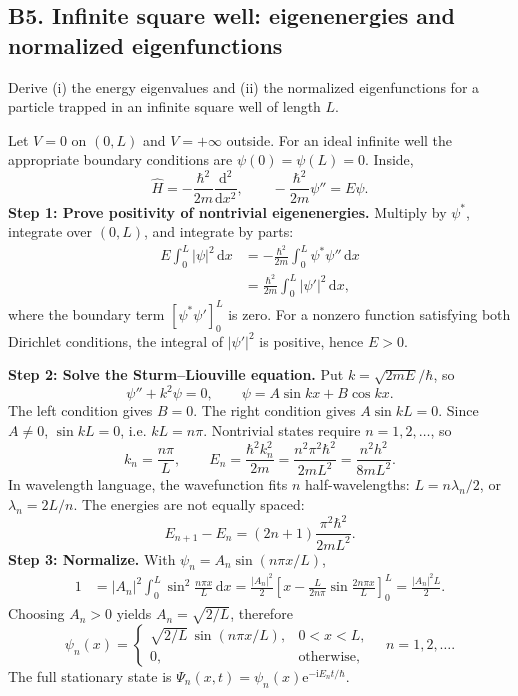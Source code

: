 \documentclass[11pt,a4paper]{article}
\newcommand{\dd}{\mathrm{d}}
\newcommand{\iu}{\mathrm{i}}
\newcommand{\ee}{\mathrm{e}}
\newcommand{\abs}[1]{\left|#1\right|}
\begin{document}
\subsection{B5. Infinite square well: eigenenergies and normalized eigenfunctions}
\begin{questionbox}
Derive (i) the energy eigenvalues and (ii) the normalized eigenfunctions for a particle trapped in an infinite square well of length $L$.
\end{questionbox}
Let $V=0$ on $(0,L)$ and $V=+\infty$ outside. For an ideal infinite well the appropriate boundary conditions are $\psi(0)=\psi(L)=0$. Inside,
\begin{equation}\hat H=-\frac{\hbar^2}{2m}\frac{\dd^2}{\dd x^2},\qquad-\frac{\hbar^2}{2m}\psi''=E\psi.\end{equation}
\textbf{Step 1: Prove positivity of nontrivial eigenenergies.} Multiply by $\psi^*$, integrate over $(0,L)$, and integrate by parts:
\begin{align}
E\int_0^L\abs\psi^2\,\dd x
&=-\frac{\hbar^2}{2m}\int_0^L\psi^*\psi''\,\dd x\\
&=\frac{\hbar^2}{2m}\int_0^L\abs{\psi'}^2\,\dd x,
\end{align}
where the boundary term $[\psi^*\psi']_0^L$ is zero. For a nonzero function satisfying both Dirichlet conditions, the integral of $\abs{\psi'}^2$ is positive, hence $E>0$.

\textbf{Step 2: Solve the Sturm--Liouville equation.} Put $k=\sqrt{2mE}/\hbar$, so
\begin{equation}
\psi''+k^2\psi=0,\qquad\psi=A\sin kx+B\cos kx.
\end{equation}
The left condition gives $B=0$. The right condition gives $A\sin kL=0$. Since $A\ne0$, $\sin kL=0$, i.e. $kL=n\pi$. Nontrivial states require $n=1,2,\ldots$, so
\begin{equation}
\boxed{k_n=\frac{n\pi}{L},\qquad E_n=\frac{\hbar^2k_n^2}{2m}=\frac{n^2\pi^2\hbar^2}{2mL^2}=\frac{n^2h^2}{8mL^2}.}
\end{equation}
In wavelength language, the wavefunction fits $n$ half-wavelengths: $L=n\lambda_n/2$, or $\lambda_n=2L/n$. The energies are not equally spaced:
\begin{equation}
E_{n+1}-E_n=(2n+1)\frac{\pi^2\hbar^2}{2mL^2}.
\end{equation}
\textbf{Step 3: Normalize.} With $\psi_n=A_n\sin(n\pi x/L)$,
\begin{align}
1&=\abs{A_n}^2\int_0^L\sin^2\frac{n\pi x}{L}\,\dd x
=\frac{\abs{A_n}^2}{2}\left[x-\frac{L}{2n\pi}\sin\frac{2n\pi x}{L}\right]_0^L
=\frac{\abs{A_n}^2L}{2}.
\end{align}
Choosing $A_n>0$ yields $A_n=\sqrt{2/L}$, therefore
\begin{equation}\label{eq:infinite_eigen}
\boxed{\psi_n(x)=\begin{cases}\sqrt{2/L}\,\sin(n\pi x/L),&0<x<L,\\0,&\text{otherwise},\end{cases}\quad n=1,2,\ldots.}
\end{equation}
The full stationary state is $\Psi_n(x,t)=\psi_n(x)\ee^{-\iu E_nt/\hbar}$.
\end{document}
